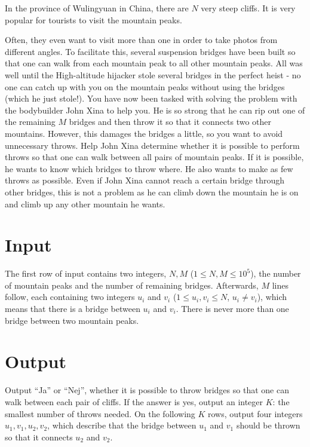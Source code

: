 \noindent
In the province of Wulingyuan in China, there are $N$ very steep cliffs. It is very popular for tourists to visit the mountain peaks.

Often, they even want to visit more than one
in order to take photos from different angles. To facilitate this, several suspension bridges have been built so that one can walk from each mountain peak to all other mountain peaks.
All was well until the High-altitude hijacker stole several bridges in the perfect heist - no one can catch up with you on the mountain peaks without using the bridges (which he just stole!).
You have now been tasked with solving the problem with the bodybuilder John Xina to help you. He is so strong that he can rip out one of the remaining $M$ bridges and then
throw it so that it connects two other mountains. However, this damages the bridges a little, so you want to avoid unnecessary throws. Help John Xina determine whether it is
possible to perform throws so that one can walk between all pairs of mountain peaks. If it is possible, he wants to know which bridges to throw where.
He also wants to make as few throws as possible. Even if John Xina cannot reach a certain bridge through other bridges, this is not a problem as he can climb down
the mountain he is on and climb up any other mountain he wants.

\section*{Input}
\noindent
The first row of input contains two integers, $N,M$ ($1 \leq N,M \leq 10^5$), the number of mountain peaks and the number of remaining bridges.
Afterwards, $M$ lines follow, each containing two integers $u_i$ and $v_i$ ($1 \leq u_i, v_i \leq N$, $u_i \neq v_i$), which means that there is a bridge between
$u_i$ and $v_i$. There is never more than one bridge between two mountain peaks.

\section*{Output}
\noindent
Output ``Ja'' or ``Nej'', whether it is possible to throw bridges so that one can walk between each pair of cliffs.
If the answer is yes, output an integer $K$: the smallest number of throws needed.
On the following $K$ rows, output four integers $u_1, v_1, u_2, v_2$,  which describe that the bridge between $u_1$ and $v_1$ should be thrown so that it connects $u_2$ and $v_2$.
